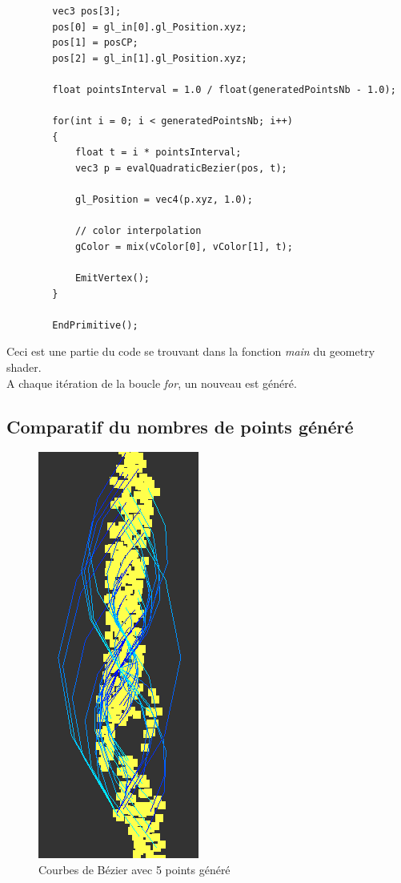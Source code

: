 \documentclass[12pt]{article}
\begin{document}
		\begin{lstlisting}
		vec3 pos[3];
	    pos[0] = gl_in[0].gl_Position.xyz;
	    pos[1] = posCP;
	    pos[2] = gl_in[1].gl_Position.xyz;
	
	    float pointsInterval = 1.0 / float(generatedPointsNb - 1.0);
	
	    for(int i = 0; i < generatedPointsNb; i++)
	    {
	        float t = i * pointsInterval;
	        vec3 p = evalQuadraticBezier(pos, t);
	
	        gl_Position = vec4(p.xyz, 1.0);
	
	        // color interpolation
	        gColor = mix(vColor[0], vColor[1], t);
	
	        EmitVertex();
	    }
	
	    EndPrimitive();
		\end{lstlisting}
		
		Ceci est une partie du code se trouvant dans la fonction \textit{main} du geometry shader. \\
		A chaque itération de la boucle \textit{for}, un nouveau est généré.\\
		
		\clearpage
	
		\subsection{Comparatif du nombres de points généré}	 \label{comparatif_courbes_bezier}		
		\begin{figure}[!h]
		\begin{center}
		\includegraphics[scale=.60]{5_generated_points.png}
		\caption{Courbes de Bézier avec 5 points généré}
		\end{center}
		\end{figure}
		
\end{document}
